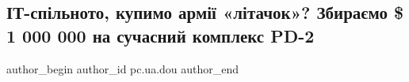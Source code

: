  
 
 
 
 
 
\subsection{ІТ-спільното, купимо армії «літачок»? Збираємо \$ 1 000 000 на сучасний комплекс PD-2}
\label{sec:06_05_2022.stz.pc.ua.dou.1.litachok}
 
\ifcmt
 author_begin
   author_id pc.ua.dou
 author_end
\fi




